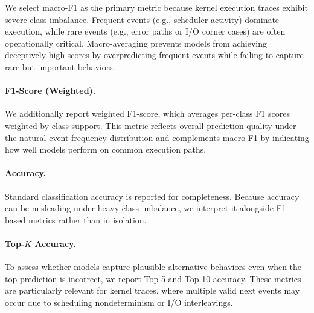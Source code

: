 We select macro-F1 as the primary metric because kernel execution traces exhibit severe class imbalance. Frequent events (e.g., scheduler activity) dominate execution, while rare events (e.g., error paths or I/O corner cases) are often operationally critical. Macro-averaging prevents models from achieving deceptively high scores by overpredicting frequent events while failing to capture rare but important behaviors.

\paragraph{F1-Score (Weighted).}
We additionally report weighted F1-score, which averages per-class F1 scores weighted by class support. This metric reflects overall prediction quality under the natural event frequency distribution and complements macro-F1 by indicating how well models perform on common execution paths.

\paragraph{Accuracy.}
Standard classification accuracy is reported for completeness. Because accuracy can be misleading under heavy class imbalance, we interpret it alongside F1-based metrics rather than in isolation.

\paragraph{Top-$K$ Accuracy.}
To assess whether models capture plausible alternative behaviors even when the top prediction is incorrect, we report Top-5 and Top-10 accuracy. These metrics are particularly relevant for kernel traces, where multiple valid next events may occur due to scheduling nondeterminism or I/O interleavings.








